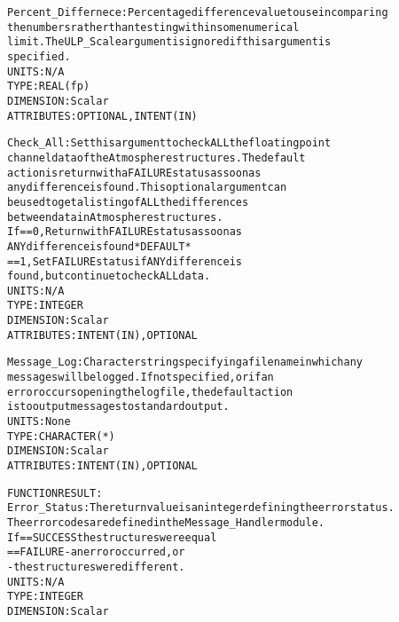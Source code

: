 \begin{alltt}
        Percent_Differnece: Percentage difference value to use in comparing
                            the numbers rather than testing within some numerical
                            limit. The ULP_Scale argument is ignored if this argument is
                            specified.
                            UNITS:      N/A
                            TYPE:       REAL(fp)
                            DIMENSION:  Scalar
                            ATTRIBUTES: OPTIONAL, INTENT(IN)
 
        Check_All:          Set this argument to check ALL the floating point
                            channel data of the Atmosphere structures. The default
                            action is return with a FAILURE status as soon as
                            any difference is found. This optional argument can
                            be used to get a listing of ALL the differences
                            between data in Atmosphere structures.
                            If == 0, Return with FAILURE status as soon as
                                     ANY difference is found  *DEFAULT*
                               == 1, Set FAILURE status if ANY difference is
                                     found, but continue to check ALL data.
                            UNITS:      N/A
                            TYPE:       INTEGER
                            DIMENSION:  Scalar
                            ATTRIBUTES: INTENT(IN), OPTIONAL
 
        Message_Log:        Character string specifying a filename in which any
                            messages will be logged. If not specified, or if an
                            error occurs opening the log file, the default action
                            is to output messages to standard output.
                            UNITS:      None
                            TYPE:       CHARACTER(*)
                            DIMENSION:  Scalar
                            ATTRIBUTES: INTENT(IN), OPTIONAL
 
  FUNCTION RESULT:
        Error_Status:       The return value is an integer defining the error status.
                            The error codes are defined in the Message_Handler module.
                            If == SUCCESS the structures were equal
                               == FAILURE - an error occurred, or
                                          - the structures were different.
                            UNITS:      N/A
                            TYPE:       INTEGER
                            DIMENSION:  Scalar
 
  \end{alltt}

